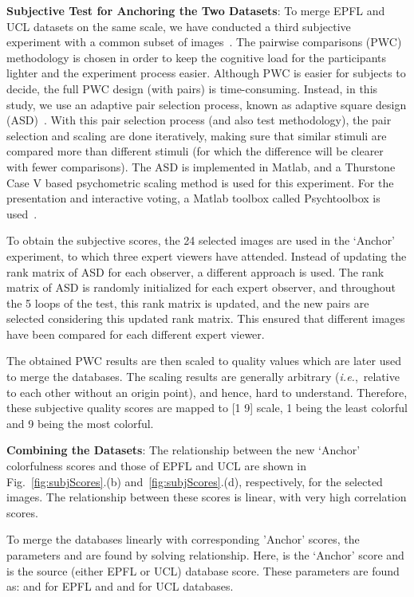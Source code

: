 \documentclass{article}
\newcommand{\ie}[0]{\textit{i.e.},~}
\begin{document}
\textbf{Subjective Test for Anchoring the Two Datasets}: 
To merge EPFL and UCL datasets on the same scale, we have conducted a third subjective experiment with a common subset of images~\cite{pitrey2011aligning}. The pairwise comparisons (PWC) methodology is chosen in order to keep the cognitive load for the participants lighter and the experiment process easier. Although PWC is easier for subjects to decide, the full PWC design (with  pairs) is time-consuming. Instead, in this study, we use an adaptive pair selection process, known as adaptive square design (ASD)~\cite{li2013boosting, P915}. With this pair selection process (and also test methodology), the pair selection and scaling are done iteratively, making sure that similar stimuli are compared more than different stimuli (for which the difference will be clearer with fewer comparisons). The ASD is implemented in Matlab, and a Thurstone Case V based psychometric scaling method is used for this experiment. For the presentation and interactive voting, a Matlab toolbox called Psychtoolbox is used~\cite{kleiner2007whats}.




To obtain the subjective scores, the 24 selected images are used in the `Anchor' experiment, to which three expert viewers have attended. Instead of updating the rank matrix of ASD for each observer, a different approach is used. The rank matrix of ASD is randomly initialized for each expert observer, and throughout the 5 loops of the test, this rank matrix is updated, and the new pairs are selected considering this updated rank matrix. This ensured that different images have been compared for each different expert viewer. 

The obtained PWC results are then scaled to quality values which are later used to merge the databases. The scaling results are generally arbitrary (\ie relative to each other without an origin point), and hence, hard to understand. Therefore, these subjective quality scores are mapped to [1 9] scale, 1 being the least colorful and 9 being the most colorful. 



\textbf{Combining the Datasets}: 
The relationship between the new `Anchor' colorfulness scores and those of EPFL and UCL are shown in 
Fig.~\ref{fig:subjScores}.(b) and~\ref{fig:subjScores}.(d), 
respectively, for the selected images. The relationship between these scores is linear, with very high correlation scores. 

To merge the databases linearly with corresponding 'Anchor' scores, the parameters  and  are found by solving  relationship. Here,  is the `Anchor' score and  is the source (either EPFL or UCL) database score. These parameters are found as:   and   for EPFL and   and   for UCL databases.
\end{document}

